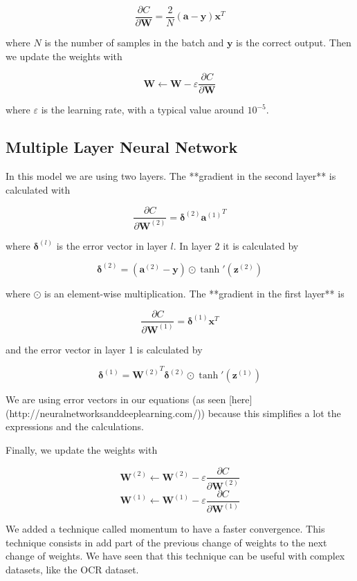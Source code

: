\documentclass{article}
\begin{document}
$$\frac{\partial C}{\partial \mathbf{W}} = \frac{2}{N} \left ( \mathbf{a} - \mathbf{y} \right ) \mathbf{x}^T$$

where $N$ is the number of samples in the batch and $\mathbf{y}$ is the correct output. Then we update the weights with

$$\mathbf{W} \leftarrow \mathbf{W} - \varepsilon \frac{\partial C}{\partial \mathbf{W}}$$

where $\varepsilon$ is the learning rate, with a typical value around $10^{-5}$.


\subsection{Multiple Layer Neural Network}

In this model we are using two layers. The **gradient in the second layer** is calculated with

$$\frac{\partial C}{\partial \mathbf{W}^{(2)}} = \mathbf{\delta}^{(2)} {\mathbf{a}^{(1)}}^T$$

where $\mathbf{\delta}^{(l)}$ is the error vector in layer $l$. In layer 2 it is calculated by

$$\mathbf{\delta}^{(2)} = (\mathbf{a}^{(2)} - \mathbf{y}) \odot \tanh'\left (\mathbf{z}^{(2)} \right )$$

where $\odot$ is an element-wise multiplication. The **gradient in the first layer** is

$$\frac{\partial C}{\partial \mathbf{W}^{(1)}} = \mathbf{\delta}^{(1)} {\mathbf{x}}^T$$

and the error vector in layer 1 is calculated by

$$\mathbf{\delta}^{(1)} = {\mathbf{W}^{(2)}}^T\mathbf{\delta}^{(2)} \odot \tanh'\left (\mathbf{z}^{(1)} \right )$$

We are using error vectors in our equations (as seen [here](http://neuralnetworksanddeeplearning.com/)) because this simplifies a lot the expressions and the calculations. 

Finally, we update the weights with

$$\mathbf{W}^{(2)} \leftarrow \mathbf{W}^{(2)} - \varepsilon \frac{\partial C}{\partial \mathbf{W}^{(2)}}$$
$$\mathbf{W}^{(1)} \leftarrow \mathbf{W}^{(1)} - \varepsilon \frac{\partial C}{\partial \mathbf{W}^{(1)}}$$

We added a technique called momentum to have a faster convergence. This technique consists in add part of the previous change of weights to the next change of weights. We have seen that this technique can be useful with complex datasets, like the OCR dataset.
\end{document}
